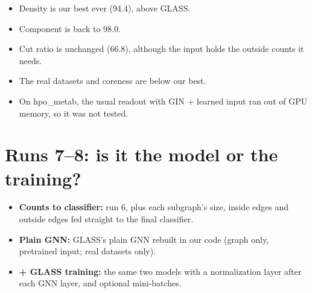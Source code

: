 \documentclass[11pt]{article}
\begin{document}
\begin{itemize}[itemsep=1pt]
  \item Density is our best ever (94.4), above GLASS.
  \item Component is back to 98.0.
  \item Cut ratio is unchanged (66.8), although the input holds the outside counts it needs.
  \item The real datasets and coreness are below our best.
  \item On hpo\_metab, the usual readout with GIN + learned input ran out of GPU memory, so it was not tested.
\end{itemize}

\section*{Runs 7--8: is it the model or the training?}

\begin{itemize}[itemsep=1pt]
  \item \textbf{Counts to classifier:} run 6, plus each subgraph's size, inside edges and outside edges fed straight to the final classifier.
  \item \textbf{Plain GNN:} GLASS's plain GNN rebuilt in our code (graph only, pretrained input; real datasets only).
  \item \textbf{+ GLASS training:} the same two models with a normalization layer after each GNN layer, and optional mini-batches.
\end{itemize}
\end{document}
